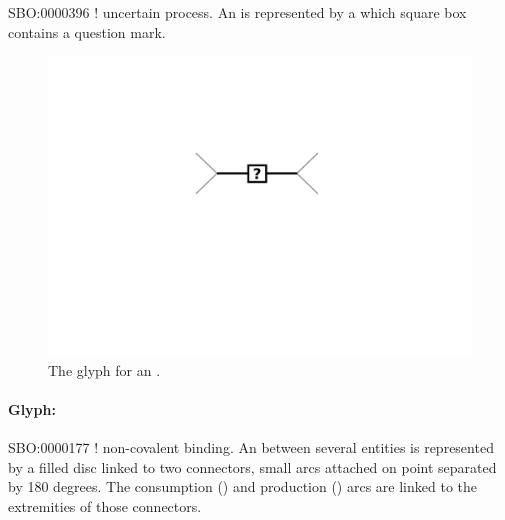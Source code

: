 \begin{glyphDescription}
 \glyphSboTerm SBO:0000396 ! uncertain process.
 \glyphNode An  is represented by a  which square box contains a question mark.
 \end{glyphDescription}

\begin{figure}[htb]
  \centering
  \includegraphics[scale = 0.5]{images/uncertain}
  \caption{The \PD glyph for an .}
  \label{fig:techref:uncertain}
\end{figure}



\paragraph{Glyph: }\label{sec:techref:association}


\begin{glyphDescription}
 \glyphSboTerm SBO:0000177 ! non-covalent binding.
 \glyphNode An  between several entities is represented by a filled disc linked to two connectors, small arcs attached on point separated by 180 degrees. The consumption () and production () arcs are linked to the extremities of those connectors.
 \end{glyphDescription}

